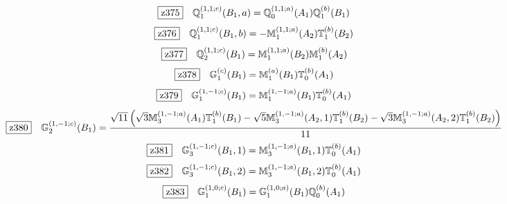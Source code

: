 \documentclass[fleqn,10pt,landscape]{jsarticle}
\begin{document}
\begin{dmath*}
\hspace*{3mm}\fbox{z375}\quad \mathbb{Q}_{1}^{(1,1;c)}(B_{1},a)=\mathbb{Q}_{0}^{(1,1;a)}(A_{1}) \mathbb{Q}_{1}^{(b)}(B_{1})
\end{dmath*}
\begin{dmath*}
\hspace*{3mm}\fbox{z376}\quad \mathbb{Q}_{1}^{(1,1;c)}(B_{1},b)=- \mathbb{M}_{1}^{(1,1;a)}(A_{2}) \mathbb{T}_{1}^{(b)}(B_{2})
\end{dmath*}
\begin{dmath*}
\hspace*{3mm}\fbox{z377}\quad \mathbb{Q}_{2}^{(1,1;c)}(B_{1})=\mathbb{M}_{1}^{(1,1;a)}(B_{2}) \mathbb{M}_{1}^{(b)}(A_{2})
\end{dmath*}
\begin{dmath*}
\hspace*{3mm}\fbox{z378}\quad \mathbb{G}_{1}^{(c)}(B_{1})=\mathbb{M}_{1}^{(a)}(B_{1}) \mathbb{T}_{0}^{(b)}(A_{1})
\end{dmath*}
\begin{dmath*}
\hspace*{3mm}\fbox{z379}\quad \mathbb{G}_{1}^{(1,-1;c)}(B_{1})=\mathbb{M}_{1}^{(1,-1;a)}(B_{1}) \mathbb{T}_{0}^{(b)}(A_{1})
\end{dmath*}
\begin{dmath*}
\hspace*{3mm}\fbox{z380}\quad \mathbb{G}_{2}^{(1,-1;c)}(B_{1})=\frac{\sqrt{11} \left(\sqrt{3} \mathbb{M}_{3}^{(1,-1;a)}(A_{1}) \mathbb{T}_{1}^{(b)}(B_{1}) - \sqrt{5} \mathbb{M}_{3}^{(1,-1;a)}(A_{2},1) \mathbb{T}_{1}^{(b)}(B_{2}) - \sqrt{3} \mathbb{M}_{3}^{(1,-1;a)}(A_{2},2) \mathbb{T}_{1}^{(b)}(B_{2})\right)}{11}
\end{dmath*}
\begin{dmath*}
\hspace*{3mm}\fbox{z381}\quad \mathbb{G}_{3}^{(1,-1;c)}(B_{1},1)=\mathbb{M}_{3}^{(1,-1;a)}(B_{1},1) \mathbb{T}_{0}^{(b)}(A_{1})
\end{dmath*}
\begin{dmath*}
\hspace*{3mm}\fbox{z382}\quad \mathbb{G}_{3}^{(1,-1;c)}(B_{1},2)=\mathbb{M}_{3}^{(1,-1;a)}(B_{1},2) \mathbb{T}_{0}^{(b)}(A_{1})
\end{dmath*}
\begin{dmath*}
\hspace*{3mm}\fbox{z383}\quad \mathbb{G}_{1}^{(1,0;c)}(B_{1})=\mathbb{G}_{1}^{(1,0;a)}(B_{1}) \mathbb{Q}_{0}^{(b)}(A_{1})
\end{dmath*}
\end{document}
